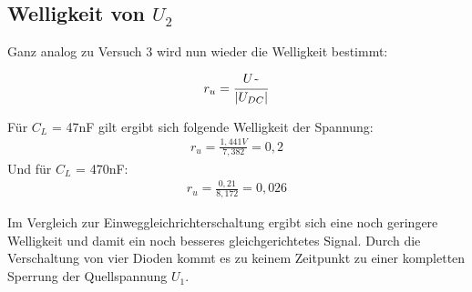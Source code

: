 \documentclass{article}
\begin{document}
\subsection{Welligkeit von $U_2$}

Ganz analog zu Versuch 3 wird nun wieder die Welligkeit bestimmt:

\begin{align*}
  r_u = \frac{U\raisebox{-0.9ex}{\~{}}}{|U_{DC}|}
\end{align*}

Für $C_L$ = 47nF gilt ergibt sich folgende Welligkeit der Spannung:
\begin{align*}
  r_u = \frac{1,441V}{7,382} = 0,2
\end{align*}
Und für $C_L$ = 470nF:
\begin{align*}
  r_u = \frac{0,21}{8,172} = 0,026
\end{align*}

Im Vergleich zur Einweggleichrichterschaltung ergibt sich eine noch geringere Welligkeit und damit ein noch besseres gleichgerichtetes Signal.
Durch die Verschaltung von vier Dioden kommt es zu keinem Zeitpunkt zu einer kompletten Sperrung der Quellspannung $U_1$.
\end{document}
